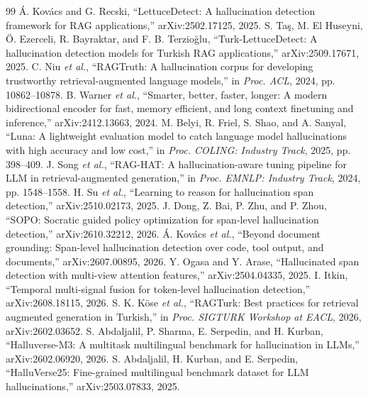 \documentclass[conference,a4paper]{IEEEtran}
\begin{document}
\begin{thebibliography}{99}
 Á. Kovács and G. Recski, ``LettuceDetect: A hallucination detection framework for RAG applications,'' arXiv:2502.17125, 2025.
 S. Taş, M. El Huseyni, Ö. Ezerceli, R. Bayraktar, and F. B. Terzioğlu, ``Turk-LettuceDetect: A hallucination detection models for Turkish RAG applications,'' arXiv:2509.17671, 2025.
 C. Niu \emph{et al.}, ``RAGTruth: A hallucination corpus for developing trustworthy retrieval-augmented language models,'' in \emph{Proc. ACL}, 2024, pp. 10862--10878.
 B. Warner \emph{et al.}, ``Smarter, better, faster, longer: A modern bidirectional encoder for fast, memory efficient, and long context finetuning and inference,'' arXiv:2412.13663, 2024.
 M. Belyi, R. Friel, S. Shao, and A. Sanyal, ``Luna: A lightweight evaluation model to catch language model hallucinations with high accuracy and low cost,'' in \emph{Proc. COLING: Industry Track}, 2025, pp. 398--409.
 J. Song \emph{et al.}, ``RAG-HAT: A hallucination-aware tuning pipeline for LLM in retrieval-augmented generation,'' in \emph{Proc. EMNLP: Industry Track}, 2024, pp. 1548--1558.
 H. Su \emph{et al.}, ``Learning to reason for hallucination span detection,'' arXiv:2510.02173, 2025.
 J. Dong, Z. Bai, P. Zhu, and P. Zhou, ``SOPO: Socratic guided policy optimization for span-level hallucination detection,'' arXiv:2610.32212, 2026.
 Á. Kovács \emph{et al.}, ``Beyond document grounding: Span-level hallucination detection over code, tool output, and documents,'' arXiv:2607.00895, 2026.
 Y. Ogasa and Y. Arase, ``Hallucinated span detection with multi-view attention features,'' arXiv:2504.04335, 2025.
 I. Itkin, ``Temporal multi-signal fusion for token-level hallucination detection,'' arXiv:2608.18115, 2026.
 S. K. Köse \emph{et al.}, ``RAGTurk: Best practices for retrieval augmented generation in Turkish,'' in \emph{Proc. SIGTURK Workshop at EACL}, 2026, arXiv:2602.03652.
 S. Abdaljalil, P. Sharma, E. Serpedin, and H. Kurban, ``Halluverse-M3: A multitask multilingual benchmark for hallucination in LLMs,'' arXiv:2602.06920, 2026.
 S. Abdaljalil, H. Kurban, and E. Serpedin, ``HalluVerse25: Fine-grained multilingual benchmark dataset for LLM hallucinations,'' arXiv:2503.07833, 2025.

\end{thebibliography}
\end{document}
